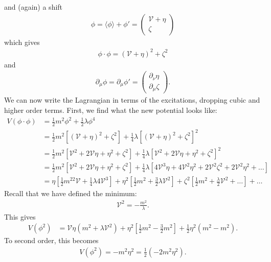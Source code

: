 \documentclass{book}
\numberwithin{equation}{section}
\theoremstyle{definition}
\newcommand{\p}{\partial}
\begin{document}
and (again) a shift
\begin{align}
\phi = \langle \phi  \rangle + \phi' = \begin{pmatrix}
\mathcal{V} + \eta \\ \zeta 
\end{pmatrix}
\end{align}
which gives
\begin{align}
\phi \cdot \phi = (\mathcal{V} + \eta )^2 + \zeta^2
\end{align}
and 
\begin{align}
\p_\mu\phi = \p_\mu\phi' = \begin{pmatrix}
\p_\nu\eta\\\p_\mu\zeta
\end{pmatrix}.
\end{align}
We can now write the Lagrangian in terms of the excitations, dropping cubic and higher order terms. First, we find what the new potential looks like:
\begin{align}
V(\phi\cdot\phi) &= \frac{1}{2}m^2\phi^2 + \frac{1}{2}\lambda\phi^4\\
&= \frac{1}{2}m^2\left[ (\mathcal{V} + \eta )^2 + \zeta^2  \right] + \frac{1}{4}\lambda\left[ (\mathcal{V} + \eta )^2 + \zeta^2  \right]^2\\
&= \frac{1}{2}m^2\left[\mathcal{V}^2 + 2\mathcal{V}\eta +\eta^2 + \zeta^2\right] + \frac{1}{4}\lambda\left[\mathcal{V}^2 + 2\mathcal{V}\eta +\eta^2 + \zeta^2\right]^2\\
&= \frac{1}{2}m^2\left[\mathcal{V}^2 + 2\mathcal{V}\eta +\eta^2 + \zeta^2\right] + \frac{1}{4}\lambda\left[4\mathcal{V}^3\eta + 4\mathcal{V}^2\eta^2 + 2\mathcal{V}^2\zeta^2 + 2\mathcal{V}^2\eta^2+\dots\right]\\
&= \eta\left[\frac{1}{2}m^22\mathcal{V} + \frac{1}{4}\lambda4\mathcal{V}^3\right] + \eta^2\left[\frac{1}{2}m^2 + \frac{3}{2}\lambda \mathcal{V}^2\right] + \zeta^2 \left[ \frac{1}{2}m^2 + \frac{\lambda}{2}\mathcal{V}^2+\dots \right] + \dots
\end{align}
Recall that we have defined the minimum:
\begin{align}
\mathcal{V}^2 = -\frac{m^2}{\lambda}.
\end{align}
This gives
\begin{align}
V(\phi^2) &= \mathcal{V}\eta(m^2 + \lambda \mathcal{V}^2) + \eta^2\left[\frac{1}{2}m^2 - \frac{3}{2}m^2\right] + \frac{1}{2}\eta^2(m^2 - m^2).
\end{align}
To second order, this becomes
\begin{align}
V(\phi^2) = -m^2\eta^2 = \frac{1}{2}(-2m^2\eta^2).
\end{align}
\end{document}
